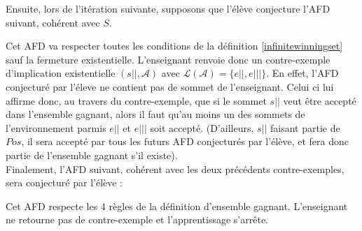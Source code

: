 \documentclass[12pt,a4paper,oneside,titlepage]{report}
\newcommand{\unary}[1][1.5ex]{\rule{1pt}{#1}}
\begin{document}
Ensuite, lors de l'itération suivante, supposons que l'élève conjecture l'AFD suivant, cohérent avec $S$.

\begin{figure}[H]
\centering
{}
\end{figure}
\noindent Cet AFD va respecter toutes les conditions de la définition \ref{infinitewinningset} sauf la fermeture existentielle. L'enseignant renvoie donc un contre-exemple d'implication existentielle $(s||, \mathcal{A})$ avec $\mathcal{L}(\mathcal{A})=\{e||,e|||\}$. En effet, l'AFD conjecturé par l'éleve ne contient pas de sommet de l'enseignant. Celui ci lui affirme donc, au travers du contre-exemple, que si le sommet $s||$ veut être accepté dans l'ensemble gagnant, alors il faut qu'au moins un des sommets de l'environnement parmis $e||$ et $e|||$ soit accepté. (D'ailleurs, $s||$ faisant partie de $Pos$, il sera accepté par tous les futurs AFD conjecturés par l'élève, et fera donc partie de l'ensemble gagnant s'il existe).\\

Finalement, l'AFD suivant, cohérent avec les deux précédents contre-exemples, sera conjecturé par l'élève :

\begin{figure}[H]
\centering
{}
\end{figure}
\noindent Cet AFD respecte les 4 règles de la définition d'ensemble gagnant. L'enseignant ne retourne pas de contre-exemple et l'apprentissage s'arrête. 
\end{document}
